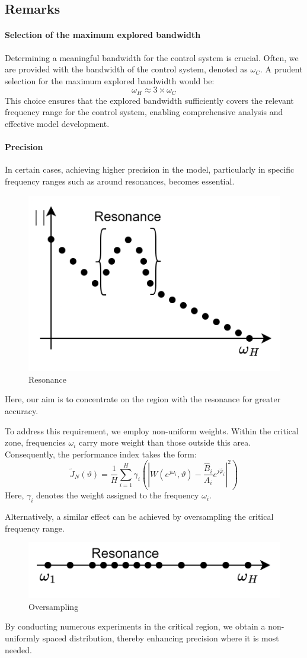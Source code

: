 \subsection{Remarks}
\paragraph*{Selection of the maximum explored bandwidth}
Determining a meaningful bandwidth for the control system is crucial. 
Often, we are provided with the bandwidth of the control system, denoted as $\omega_C$. 
A prudent selection for the maximum explored bandwidth would be:
\[\omega_H\approx 3 \times \omega_C\]
This choice ensures that the explored bandwidth sufficiently covers the relevant frequency range for the control system, enabling comprehensive analysis and effective model development.

\paragraph*{Precision}
In certain cases, achieving higher precision in the model, particularly in specific frequency ranges such as around resonances, becomes essential. 
\begin{figure}[H]
    \centering
    \includegraphics[width=0.4\linewidth]{images/res.png}
    \caption{Resonance}
\end{figure}
Here, our aim is to concentrate on the region with the resonance for greater accuracy.

To address this requirement, we employ non-uniform weights. Within the critical zone, frequencies $\omega_i$ carry more weight than those outside this area. 
Consequently, the performance index takes the form:
\[\tilde{J}_N(\vartheta)=\dfrac{1}{H}\sum_{i=1}^{H}\gamma_i\left(\left\lvert W(e^{j\omega_i},\vartheta)-\dfrac{\hat{B}_i}{A_i}e^{j\hat{\varphi}_i} \right\rvert^2 \right)\]
Here, $\gamma_i$ denotes the weight assigned to the frequency $\omega_i$.

Alternatively, a similar effect can be achieved by oversampling the critical frequency range.
\begin{figure}[H]
    \centering
    \includegraphics[width=0.5\linewidth]{images/res1.png}
    \caption{Oversampling}
\end{figure}
By conducting numerous experiments in the critical region, we obtain a non-uniformly spaced distribution, thereby enhancing precision where it is most needed.

